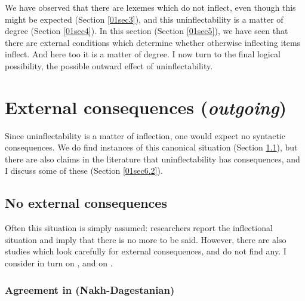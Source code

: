 \documentclass[output=paper,colorlinks,citecolor=brown]{langscibook}
\begin{document}
\largerpage
We have observed that there are lexemes which do not inflect, even though this might be expected (Section \ref{01sec3}), and this uninflectability is a matter of degree (Section \ref{01sec4}). In this section (Section \ref{01sec5}), we have seen that there are external conditions which determine whether otherwise inflecting items inflect. And here too it is a matter of degree. I now turn to the final logical possibility, the possible outward effect of uninflectability.

\section{External consequences (\textit{outgoing})} \label{01sec6}

Since uninflectability is a matter of inflection, one would expect no syntactic consequences. We do find instances of this canonical situation (Section \ref{01sec6.1}), but there are also claims in the literature that uninflectability has consequences, and I discuss some of these (Section \ref{01sec6.2}).

\subsection{No external consequences} \label{01sec6.1}

Often this situation is simply assumed: researchers report the inflectional situation and imply that there is no more to be said. However, there are also studies which look carefully for external consequences, and do not find any. I consider in turn \citet{nichols2018} on , and \citet{fedden2022} on .

\subsubsection{Agreement in  (Nakh-Dagestanian)} \label{01sec6.1.1}
\end{document}
